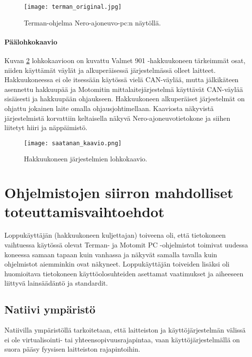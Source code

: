 \begin{figure}[H]
\centering
\texttt{[image: terman\_original.jpg]}
\caption{Terman-ohjelma Nero-ajoneuvo-pc:n näytöllä.}
\label{kuva_terman}
\end{figure}

\subsubsection{Päälohkokaavio}
Kuvan \ref{kuva_lohkokaavio} lohkokaavioon on kuvattu Valmet 901 -hakkuukoneen tärkeimmät osat, niiden käyttämät väylät ja alkuperäisessä järjestelmässä olleet laitteet. Hakkuukoneessa ei ole itsessään käytössä vielä CAN-väylää, mutta jälkikäteen asennettu hakkuupää ja Motomitin mittalaitejärjestelmä käyttävät CAN-väylää sisäisesti ja hakkuupään ohjaukseen. Hakkuukoneen alkuperäiset järjestelmät on ohjattu jokainen laite omalla ohjausjohtimellaan. Kaaviosta näkyvistä järjestelmistä korvattiin keltaisella näkyvä Nero-ajoneuvotietokone ja siihen liitetyt hiiri ja näppäimistö.

\begin{figure}[H]
\centering
\texttt{[image: saatanan\_kaavio.png]}
\caption{Hakkuukoneen järjestelmien lohkokaavio.}
\label{kuva_lohkokaavio}
\end{figure}

\newpage
\chapter{Ohjelmistojen siirron mahdolliset toteuttamisvaihtoehdot}

Loppukäyttäjän (hakkuukoneen kuljettajan) toiveena oli, että tietokoneen vaihtuessa käytössä olevat Terman- ja Motomit PC -ohjelmistot toimivat uudessa koneessa samaan tapaan kuin vanhassa ja näkyvät samalla tavalla kuin ohjelmistot aiemminkin ovat näkyneet. Loppukäyttäjän toiveiden lisäksi oli huomioitava tietokoneen käyttöolosuhteiden asettamat vaatimukset ja aiheeseen liittyvä lainsäädäntö ja standardit.

\section{Natiivi ympäristö}
Natiivilla ympäristöllä tarkoitetaan, että laitteiston ja käyttöjärjestelmän välissä ei ole virtualisointi- tai yhteensopivuusrajapintaa, vaan käyttöjärjestelmällä on suora pääsy fyysisen laitteiston rajapintoihin.


